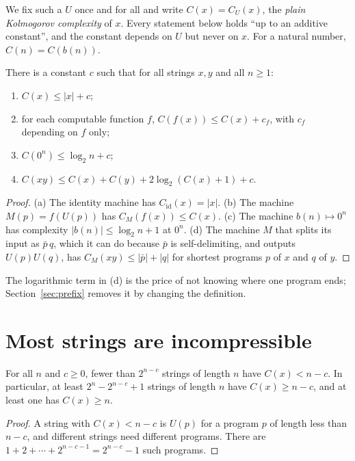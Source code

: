 We fix such a $U$ once and for all and write $C(x)=C_U(x)$, the \emph{plain Kolmogorov complexity} of $x$. Every statement below holds ``up to an additive constant'', and the constant depends on $U$ but never on $x$. For a natural number, $C(n)=C(b(n))$.

\begin{proposition}\label{prop:basicC}
There is a constant $c$ such that for all strings $x,y$ and all $n\ge1$:
\begin{enumerate}[label=(\alph*)]
\item $C(x)\le|x|+c$;
\item for each computable function $f$, $C(f(x))\le C(x)+c_f$, with $c_f$ depending on $f$ only;
\item $C(0^n)\le\log_2n+c$;
\item $C(xy)\le C(x)+C(y)+2\log_2(C(x)+1)+c$.
\end{enumerate}
\end{proposition}

\begin{proof}
(a) The identity machine has $C_{\mathrm{id}}(x)=|x|$. (b) The machine $M(p)=f(U(p))$ has $C_M(f(x))\le C(x)$. (c) The machine $b(n)\mapsto0^n$ has complexity $|b(n)|\le\log_2n+1$ at $0^n$. (d) The machine $M$ that splits its input as $\bar p\,q$, which it can do because $\bar p$ is self-delimiting, and outputs $U(p)U(q)$, has $C_M(xy)\le|\bar p|+|q|$ for shortest programs $p$ of $x$ and $q$ of $y$.
\end{proof}

The logarithmic term in (d) is the price of not knowing where one program ends; Section~\ref{sec:prefix} removes it by changing the definition.

\section{Most strings are incompressible}\label{sec:incompressiblestrings}

\begin{theorem}\label{thm:counting}
For all $n$ and $c\ge0$, fewer than $2^{n-c}$ strings of length $n$ have $C(x)<n-c$. In particular, at least $2^n-2^{n-c}+1$ strings of length $n$ have $C(x)\ge n-c$, and at least one has $C(x)\ge n$.
\end{theorem}

\begin{proof}
A string with $C(x)<n-c$ is $U(p)$ for a program $p$ of length less than $n-c$, and different strings need different programs. There are $1+2+\cdots+2^{n-c-1}=2^{n-c}-1$ such programs.
\end{proof}

